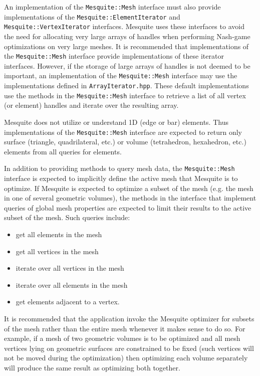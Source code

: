 An implementation of the \texttt{Mesquite::Mesh} interface must also provide
implementations of the \texttt{Mesquite::ElementIterator} and
\texttt{Mesquite::VertexIterator} interfaces.  Mesquite uses these interfaces
to avoid the need for allocating very large arrays of handles when performing
Nash-game optimizations on very large meshes.  It is recommended that
implementations of the \texttt{Mesquite::Mesh} interface provide implementations
of these iterator interfaces.  However, if the storage of large arrays of handles
is not deemed to be important, an implementation of the \texttt{Mesquite::Mesh}
interface may use the implementations defined in \texttt{ArrayIterator.hpp}. 
These default implementations use the methods in the \texttt{Mesquite::Mesh}
interface to retrieve a list of all vertex (or element) handles and iterate over
the resulting array.

Mesquite does not utilize or understand 1D (edge or bar) elements.  Thus
implementations of the \texttt{Mesquite::Mesh} interface are expected to return
only surface (triangle, quadrilateral, etc.) or volume (tetrahedron, hexahedron,
etc.) elements from all queries for elements.

In addition to providing methods to query mesh data, the \texttt{Mesquite::Mesh}
interface is expected to implicitly define the active mesh that Mesquite is to
optimize.  If Mesquite is expected to optimize a subset of the mesh (e.g. the
mesh in one of several geometric volumes), the methods in the interface that
implement queries of global mesh properties are expected to limit their results
to the active subset of the mesh.  Such queries include:
\begin{itemize}
\item get all elements in the mesh
\item get all vertices in the mesh
\item iterate over all vertices in the mesh
\item iterate over all elements in the mesh
\item get elements adjacent to a vertex.
\end{itemize}

It is recommended that the application invoke the Mesquite optimizer for subsets
of the mesh rather than the entire mesh whenever it makes sense to do so.  For
example, if a mesh of two geometric volumes is to be optimized and all mesh
vertices lying on geometric surfaces are constrained to be fixed (such vertices
will not be moved during the optimization) then optimizing each volume separately
will produce the same result as optimizing both together.  

